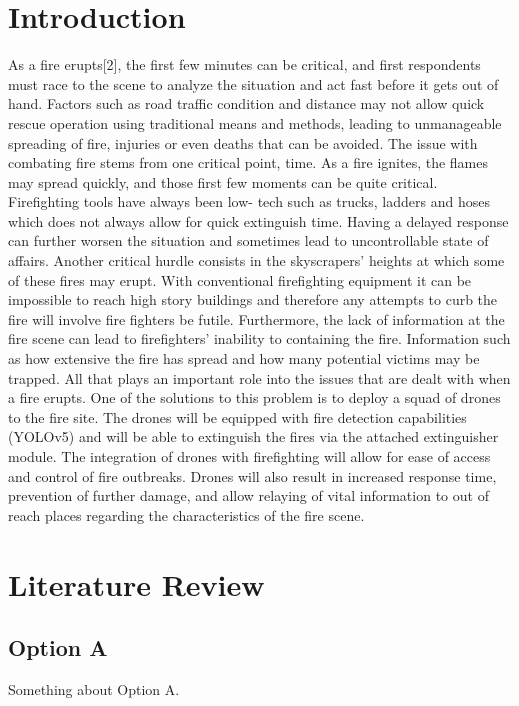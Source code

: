 \documentclass[conference]{IEEEtran}
\begin{document}
\section{Introduction}
As a fire erupts[2], the first few minutes can be critical, and first respondents must race to the scene to analyze the situation and act fast before it gets out of hand. Factors such as road traffic condition and distance may not allow quick rescue operation using traditional means and methods, leading to unmanageable spreading of fire, injuries or even deaths that can be avoided. The issue with combating fire stems from one critical point, time. As a fire ignites, the flames may
spread quickly, and those first few moments can be quite critical. Firefighting tools have always been low-
tech such as trucks, ladders and hoses which does not always allow for quick extinguish time. Having a
delayed response can further worsen the situation and sometimes lead to uncontrollable state of affairs.
Another critical hurdle consists in the skyscrapers’ heights at which some of these fires may erupt. With conventional firefighting equipment it can be impossible to reach high story buildings and therefore any
attempts to curb the fire will involve fire fighters be futile. Furthermore, the lack of information at the fire
scene can lead to firefighters’ inability to containing the fire. Information such as how extensive the fire has
spread and how many potential victims may be trapped. All that plays an important role into the issues that
are dealt with when a fire erupts. One of the solutions to this problem is to deploy a squad of drones to the fire site. The drones will be equipped with fire detection capabilities (YOLOv5) and will be able to extinguish the fires via the attached extinguisher module.  The integration of drones with firefighting will allow for ease of access and control of fire outbreaks. Drones will also result in increased response time, prevention of further damage, and allow relaying of vital information to out of reach places regarding the characteristics of the fire scene.

\section{Literature Review}

\subsection{Option A}

Something about Option A.
\end{document}
